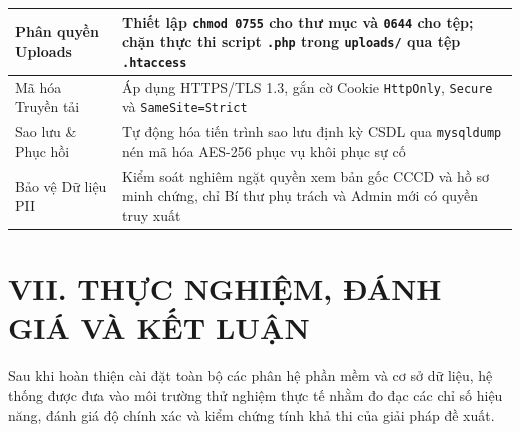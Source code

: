 \documentclass[12pt,a4paper]{report}
\begin{document}
{\begin{xltabular}{\linewidth}{|>{\raggedright\arraybackslash}p{4.2cm}|>{\raggedright\arraybackslash}X|}
  Phân quyền Uploads       & Thiết lập \texttt{chmod 0755} cho thư mục và \texttt{0644} cho tệp; chặn thực thi script \texttt{.php} trong \texttt{uploads/} qua tệp \texttt{.htaccess} \\ \hline
  Mã hóa Truyền tải        & Áp dụng HTTPS/TLS 1.3, gắn cờ Cookie \texttt{HttpOnly}, \texttt{Secure} và \texttt{SameSite=Strict}                                                       \\ \hline
  Sao lưu \& Phục hồi      & Tự động hóa tiến trình sao lưu định kỳ CSDL qua \texttt{mysqldump} nén mã hóa AES-256 phục vụ khôi phục sự cố                                             \\ \hline
  Bảo vệ Dữ liệu PII       & Kiểm soát nghiêm ngặt quyền xem bản gốc CCCD và hồ sơ minh chứng, chỉ Bí thư phụ trách và Admin mới có quyền truy xuất                                    \\ \hline
\end{xltabular}}

\section*{VII. THỰC NGHIỆM, ĐÁNH GIÁ VÀ KẾT LUẬN}

Sau khi hoàn thiện cài đặt toàn bộ các phân hệ phần mềm và cơ sở dữ liệu, hệ thống được đưa vào môi trường thử nghiệm thực tế nhằm đo đạc các chỉ số hiệu năng, đánh giá độ chính xác và kiểm chứng tính khả thi của giải pháp đề xuất.
\end{document}
